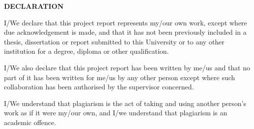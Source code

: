 \thispagestyle{empty}
\begin{center}
    \vspace*{2cm}
    
    {\Large \textbf{DECLARATION}}\\[2cm]
\end{center}

\large
I/We declare that this project report represents my/our own work, except where due acknowledgement is made, and that it has not been previously included in a thesis, dissertation or report submitted to this University or to any other institution for a degree, diploma or other qualification.

\vspace{1cm}

I/We also declare that this project report has been written by me/us and that no part of it has been written for me/us by any other person except where such collaboration has been authorised by the supervisor concerned.

\vspace{1cm}

I/We understand that plagiarism is the act of taking and using another person's work as if it were my/our own, and I/we understand that plagiarism is an academic offence.


\newpage 
